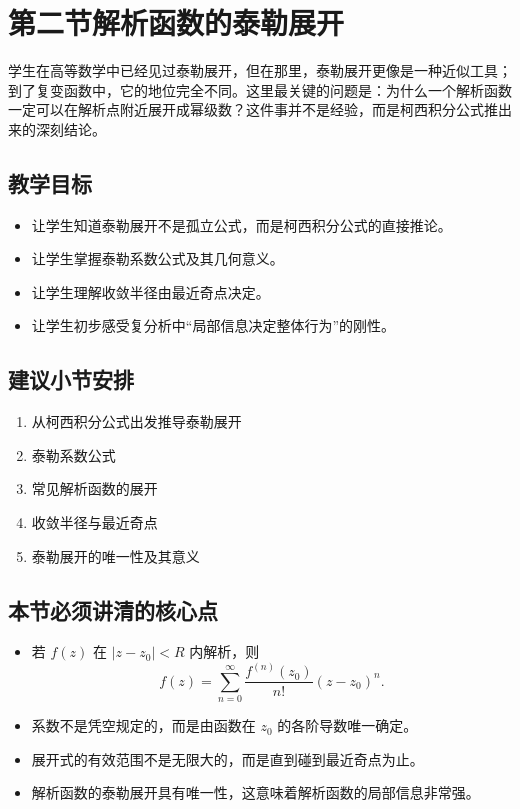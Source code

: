 \section{第二节\quad 解析函数的泰勒展开}

\begin{wulibj}[本节要解决的问题]
学生在高等数学中已经见过泰勒展开，但在那里，泰勒展开更像是一种近似工具；到了复变函数中，它的地位完全不同。这里最关键的问题是：为什么一个解析函数一定可以在解析点附近展开成幂级数？这件事并不是经验，而是柯西积分公式推出来的深刻结论。
\end{wulibj}

\subsection*{教学目标}
\begin{itemize}
    \item 让学生知道泰勒展开不是孤立公式，而是柯西积分公式的直接推论。
    \item 让学生掌握泰勒系数公式及其几何意义。
    \item 让学生理解收敛半径由最近奇点决定。
    \item 让学生初步感受复分析中``局部信息决定整体行为''的刚性。
\end{itemize}

\subsection*{建议小节安排}
\begin{enumerate}
    \item 从柯西积分公式出发推导泰勒展开
    \item 泰勒系数公式
    \item 常见解析函数的展开
    \item 收敛半径与最近奇点
    \item 泰勒展开的唯一性及其意义
\end{enumerate}

\subsection*{本节必须讲清的核心点}
\begin{itemize}
    \item 若 $f(z)$ 在 $|z-z_0|<R$ 内解析，则
    \[
        f(z) = \sum_{n=0}^{\infty} \frac{f^{(n)}(z_0)}{n!}(z-z_0)^n.
    \]
    \item 系数不是凭空规定的，而是由函数在 $z_0$ 的各阶导数唯一确定。
    \item 展开式的有效范围不是无限大的，而是直到碰到最近奇点为止。
    \item 解析函数的泰勒展开具有唯一性，这意味着解析函数的局部信息非常强。
\end{itemize}

